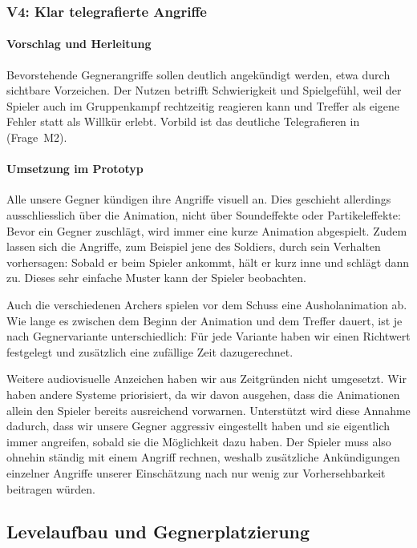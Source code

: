 \documentclass[../Main.tex]{subfiles}
\begin{document}
\subsubsection{V4: Klar telegrafierte Angriffe} \label{sec:V4}

\paragraph{Vorschlag und Herleitung}
Bevorstehende Gegnerangriffe sollen deutlich angekündigt werden, etwa durch sichtbare Vorzeichen. Der Nutzen betrifft Schwierigkeit und Spielgefühl, weil der Spieler auch im Gruppenkampf rechtzeitig reagieren kann und Treffer als eigene Fehler statt als Willkür erlebt. Vorbild ist das deutliche Telegrafieren in  (Frage~M2).

\paragraph{Umsetzung im Prototyp}
Alle unsere Gegner kündigen ihre Angriffe visuell an. Dies geschieht allerdings ausschliesslich über die Animation, nicht über Soundeffekte oder Partikeleffekte: Bevor ein Gegner zuschlägt, wird immer eine kurze Animation abgespielt. Zudem lassen sich die Angriffe, zum Beispiel jene des Soldiers, durch sein Verhalten vorhersagen: Sobald er beim Spieler ankommt, hält er kurz inne und schlägt dann zu. Dieses sehr einfache Muster kann der Spieler beobachten.

Auch die verschiedenen Archers spielen vor dem Schuss eine Ausholanimation ab. Wie lange es zwischen dem Beginn der Animation und dem Treffer dauert, ist je nach Gegnervariante unterschiedlich: Für jede Variante haben wir einen Richtwert festgelegt und zusätzlich eine zufällige Zeit dazugerechnet.

Weitere audiovisuelle Anzeichen haben wir aus Zeitgründen nicht umgesetzt. Wir haben andere Systeme priorisiert, da wir davon ausgehen, dass die Animationen allein den Spieler bereits ausreichend vorwarnen. Unterstützt wird diese Annahme dadurch, dass wir unsere Gegner aggressiv eingestellt haben und sie eigentlich immer angreifen, sobald sie die Möglichkeit dazu haben. Der Spieler muss also ohnehin ständig mit einem Angriff rechnen, weshalb zusätzliche Ankündigungen einzelner Angriffe unserer Einschätzung nach nur wenig zur Vorhersehbarkeit beitragen würden.

\subsection{Levelaufbau und Gegnerplatzierung} \label{sec:UmsetzungLevel}
\end{document}
